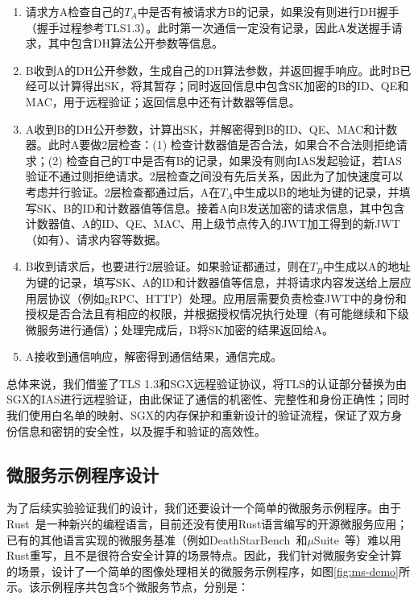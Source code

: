 \begin{enumerate}
    \item 请求方A检查自己的$T_A$中是否有被请求方B的记录，如果没有则进行DH握手（握手过程参考TLS1.3）。此时第一次通信一定没有记录，因此A发送握手请求，其中包含DH算法公开参数等信息。
    \item B收到A的DH公开参数，生成自己的DH算法参数，并返回握手响应。此时B已经可以计算得出SK，将其暂存；同时返回信息中包含SK加密的B的ID、QE和MAC，用于远程验证；返回信息中还有计数器等信息。
    \item A收到B的DH公开参数，计算出SK，并解密得到B的ID、QE、MAC和计数器。此时A要做2层检查：(1) 检查计数器值是否合法，如果合不合法则拒绝请求；(2) 检查自己的T中是否有B的记录，如果没有则向IAS发起验证，若IAS验证不通过则拒绝请求。2层检查之间没有先后关系，因此为了加快速度可以考虑并行验证。2层检查都通过后，A在$T_A$中生成以B的地址为键的记录，并填写SK、B的ID和计数器值等信息。接着A向B发送加密的请求信息，其中包含计数器值、A的ID、QE、MAC、用上级节点传入的JWT加工得到的新JWT（如有）、请求内容等数据。
    \item B收到请求后，也要进行2层验证。如果验证都通过，则在$T_B$中生成以A的地址为键的记录，填写SK、A的ID和计数器值等信息，并将请求内容发送给上层应用层协议（例如gRPC、HTTP）处理。应用层需要负责检查JWT中的身份和授权是否合法且有相应的权限，并根据授权情况执行处理（有可能继续和下级微服务进行通信）；处理完成后，B将SK加密的结果返回给A。
    \item A接收到通信响应，解密得到通信结果，通信完成。
\end{enumerate}

总体来说，我们借鉴了TLS 1.3和SGX远程验证协议，将TLS的认证部分替换为由SGX的IAS进行远程验证，由此保证了通信的机密性、完整性和身份正确性；同时我们使用白名单的映射、SGX的内存保护和重新设计的验证流程，保证了双方身份信息和密钥的安全性，以及握手和验证的高效性。

\subsection{微服务示例程序设计}\label{subsec:ms-example}

为了后续实验验证我们的设计，我们还要设计一个简单的微服务示例程序。由于Rust~\cite{rust-lang}是一种新兴的编程语言，目前还没有使用Rust语言编写的开源微服务应用；已有的其他语言实现的微服务基准（例如DeathStarBench~\cite{gan2019open}和$\mu$Suite~\cite{sriraman2018mu}等）难以用Rust重写，且不是很符合安全计算的场景特点。因此，我们针对微服务安全计算的场景，设计了一个简单的图像处理相关的微服务示例程序，如图\ref{fig:ms-demo}所示。该示例程序共包含5个微服务节点，分别是：

